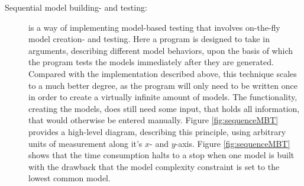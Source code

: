 \begin{description}
	\item[Sequential model building- and testing:]
	is a way of implementing model-based testing that involves on-the-fly model creation- and testing. Here a program is designed to take in arguments, describing different model behaviors, upon the basis of which the program tests the models immediately after they are generated. Compared with the implementation described above, this technique scales to a much better degree, as the program will only need to be written once in order to create a virtually infinite amount of models. The functionality, creating the models, does still need some input, that holds all information, that would otherwise be entered manually. Figure \ref{fig:sequenceMBT} provides a high-level diagram, describing this principle, using arbitrary units of measurement along it's $x$- and $y$-axis.
%
%			
%			
%
	Figure \ref{fig:sequenceMBT} shows that the time consumption halts to a stop when one model is built with the drawback that the model complexity constraint is set to the lowest common model.
\end{description}
\newpage
